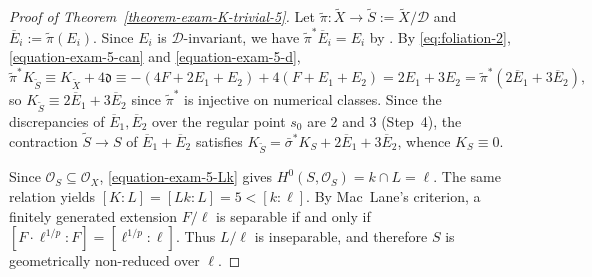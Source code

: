 \documentclass[reqno,oneside]{amsart}
\theoremstyle{definition}
\theoremstyle{plain}
\numberwithin{equation}{section}
\begin{document}
\begin{proof}[Proof of Theorem~\ref{theorem-exam-K-trivial-5}]
  \medskip
  Let $\tilde\pi\colon\widetilde X\to\widetilde S:=\widetilde X/\mathcal D$ and $\overline E_i:=\tilde\pi(E_i)$.
  Since $E_i$ is $\mathcal D$-invariant, we have $\tilde\pi^*\overline E_i=E_i$ by \cite[Proposition~1]{Rudakov-Shafarevich-1976}.
  By \eqref{eq:foliation-2}, \eqref{equation-exam-5-can} and \eqref{equation-exam-5-d},
  \[
    \tilde\pi^*K_{\widetilde S}\equiv K_{\widetilde X}+4\mathfrak d
    \equiv-(4F+2E_1+E_2)+4(F+E_1+E_2)=2E_1+3E_2
    =\tilde\pi^*(2\overline E_1+3\overline E_2),
  \]
  so $K_{\widetilde S}\equiv2\overline E_1+3\overline E_2$ since $\tilde{\pi}^*$ is injective on numerical classes.
  Since the discrepancies of $\overline E_1,\overline E_2$ over the regular point $s_0$ are $2$ and $3$ (Step~4), the contraction $\widetilde S\to S$ of $\overline E_1+\overline E_2$ satisfies $K_{\widetilde S}=\bar\sigma^*K_S+2\overline E_1+3\overline E_2$, whence $K_S\equiv0$.

  \smallskip
  Since $\mathcal O_S\subseteq\mathcal O_X$, \eqref{equation-exam-5-Lk} gives $H^0(S,\mathcal O_S)=k\cap L=\ell$.
  The same relation yields $[K:L]=[Lk:L]=5<[k:\ell]$.
  By Mac~Lane's criterion, a finitely generated extension $F/\ell$ is separable if and only if $[F\cdot\ell^{1/p}:F]=[\ell^{1/p}:\ell]$. 
  Thus $L/\ell$ is inseparable, and therefore $S$ is geometrically non-reduced over $\ell$.
\end{proof}
\end{document}
